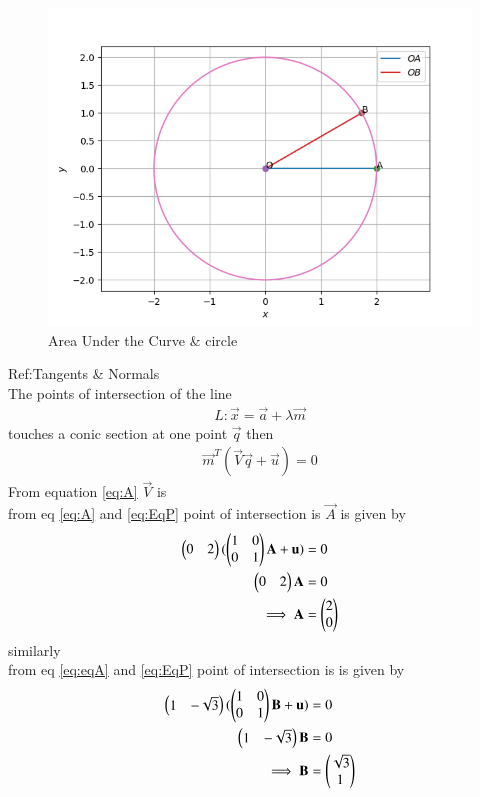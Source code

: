 \documentclass[journal,12pt,twocolumn]{IEEEtran}
\begin{document}
\begin{figure}[H]
\centering
\includegraphics[width=\columnwidth]{circle.png}
\caption{Area Under the Curve & circle  }
\label{fig:1}
\end{figure}
Ref:Tangents & Normals \\
The points of intersection of the line 
\begin{align}
    L:  \vec{x} = \vec{a} + \lambda \vec{m} 
\end{align}
touches a conic section at one point $\vec{q}$ then
\begin{align}
\vec{m}^T(\vec{V} \vec{q}+\vec{u}) = 0  \label{eq:EqP}
\end{align}
From equation \eqref{eq:A} $\Vec{V}$ is  \\
from eq \eqref{eq:A} and \eqref{eq:EqP} point of intersection is $\Vec{A}$ is given by
\begin{align}
    \begin{pmatrix}0 & 2\end{pmatrix} (\begin{pmatrix}1&0\\0&1\end{pmatrix}\mathbf{A}+\mathbf{u})&=0 \\
    \begin{pmatrix}0&2\end{pmatrix}\mathbf{A}&=0 \\
    \implies \mathbf{A}&=\begin{pmatrix}2\\ 0\end{pmatrix} 
\end{align}
similarly \\
from eq \eqref{eq:eqA} and \eqref{eq:EqP} point of intersection is  is given by
\begin{align}
    \begin{pmatrix}1 & -\sqrt{3}\end{pmatrix} (\begin{pmatrix}1&0\\0&1\end{pmatrix}\mathbf{B}+\mathbf{u})&=0 \\
    \begin{pmatrix}1 & -\sqrt{3}\end{pmatrix}\mathbf{B}&=0 \\
    \implies \mathbf{B}&=\begin{pmatrix}\sqrt{3} \\ 1 \end{pmatrix} 
\end{align}
\end{document}
